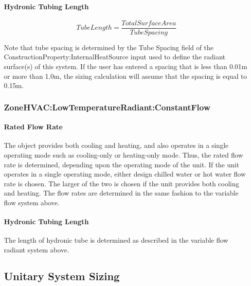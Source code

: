 \paragraph{Hydronic Tubing Length}\label{hydronic-tubing-length}

\begin{equation}
TubeLength = \frac{{TotalSurfaceArea}}{{TubeSpacing}}
\end{equation}

Note that tube spacing is determined by the Tube Spacing field of the
ConstructionProperty:InternalHeatSource input used to define the radiant
surface(s) of this system.  If the user has entered a spacing that is less
than 0.01m or more than 1.0m, the sizing calculation will assume that the
spacing is equal to 0.15m.

\subsubsection{ZoneHVAC:LowTemperatureRadiant:ConstantFlow}\label{zonehvaclowtemperatureradiantconstantflow}

\paragraph{Rated Flow Rate}\label{rated-flow-rate}

The object provides both cooling and heating, and also operates in a single operating mode such as cooling-only or heating-only mode. Thus, the rated flow rate is determined, depending upon the operating mode of the unit. If the unit operates in a single operating mode, either design chilled water or hot water flow rate is chosen. The larger of the two is chosen if the unit provides both cooling and heating. The flow rates are determined in the same fashion to the variable flow system above.

\paragraph{Hydronic Tubing Length}\label{hydronic-tubing-length-1}

The length of hydronic tube is determined as described in the variable flow radiant system above.

\subsection{Unitary System Sizing}\label{unitary-system-sizing}

